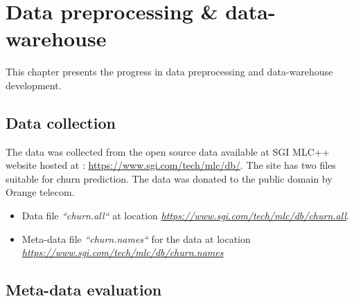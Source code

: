 \setlength{\footskip}{8mm}

\chapter{Data preprocessing \& data-warehouse}
\label{ch:dpdd}
This chapter presents the progress in data preprocessing and data-warehouse development.

\section{Data collection}
The data was collected from the open source data available at SGI MLC++ website hosted at : \url{https://www.sgi.com/tech/mlc/db/}. The site has two files suitable for churn prediction. The data was donated to the public domain by Orange telecom.
\begin{itemize}
	\item Data file \textit{``churn.all``} at location  \textit{\url{https://www.sgi.com/tech/mlc/db/churn.all}}.
	\item Meta-data file \textit{``churn.names``} for the data at location \textit{\url{https://www.sgi.com/tech/mlc/db/churn.names}}
\end{itemize}

\section{Meta-data evaluation}

